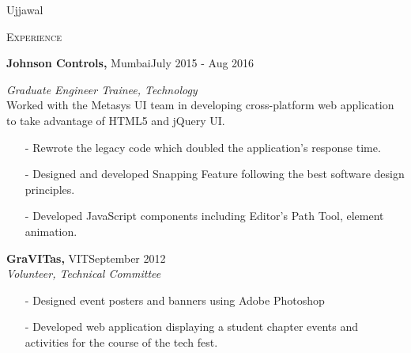 \documentclass[a4paper, 11pt]{article}
\begin{document}

\begin{minipage}{0.45\textwidth}
\begin{Huge}
	{\selectfont
		\flushleft
		Ujjawal
	}
\end{Huge}
\end{minipage}

\hrulefill 

\vspace{5mm}

\begin{minipage}[t]{0.15\textwidth}
	\small \textsc{Experience}
\end{minipage}
\hfill
\begin{minipage}[t]{0.80\textwidth}
	\noindent \textbf{Johnson Controls,} Mumbai\hfill {\scriptsize \textrm{July 2015 - Aug 2016}}\\
	{\small \textit{Graduate Engineer Trainee, Technology}\\
	Worked with the Metasys UI team in developing cross-platform web application to take advantage of HTML5 and jQuery UI. 
	\begin{itemize}[noitemsep, topsep=0pt]
		\item[-] Rewrote the legacy code which doubled the application's response time.
		\item[-] Designed and developed Snapping Feature following the best software design principles. 
		\item[-] Developed JavaScript components including Editor's Path Tool, element animation.\\
	\end{itemize}
	}
	
	\noindent \textbf{GraVITas,} VIT\hfill {\scriptsize \textrm{September 2012}}\\
	\small \textit{Volunteer, Technical Committee}

	\begin{itemize}[noitemsep, topsep=0pt]
		\item[-] Designed event posters and banners using Adobe Photoshop 
		\item[-] Developed web application displaying a student chapter events and activities for the course of the tech fest.
	\end{itemize}
	
\end{minipage}

\vspace{5mm}
\end{document}

